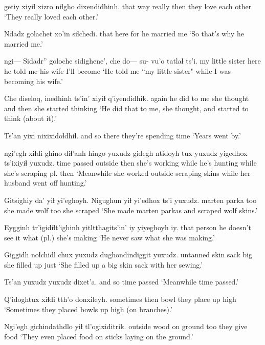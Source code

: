 \documentclass[12pt]{article}
\begin{document}
      getiy xiyiɬ xizro {niɬgho dixendidhinh.}
{that way} really then {} {they love each other}
\glt `They really loved each other.' 
\glend

\gll Ndadz  golachet xo'in siɬchedi.
that  here       for   {he married me}
\glt `So that's why he married me.'
\glend

\gll ngi--- Sidadr''           goloche   sidighene', {che do---} su- vu'o     tatlaɬ      ts'i.
{} {my little sister} here    {he told me} {} {}  {his wife} {I'll become }
\glt `He told me ``my little sister" while I was becoming his wife.'
\glend

\gll Che   diseloq,      inedhinh    ts'in' xiyiɬ q'iyendidhik.
again {he did to me} {she thought} and  then  {she started thinking}
\glt `He did that to me, she thought, and started to think (about it).'
\glend

\gll Ts'an  yixi      nixixidoɬdhiɬ.
{and so} there {they're spending time}
\glt `Years went by.'
\glend

 ngi'egh xiɬdi {ghino diɬ'anh}  hingo yuxudz {gidegh ntidoyh} tux   yuxudz yigedhox       ts'ixiyiɬ yuxudz.
{time passed} outside then  {she's working} while {} {he's hunting}     while {}   {she's scraping pl.}  then
\glt `Meanwhile she worked outside scraping skins while her husband went off hunting.'
\glend

\gll Gitsighiy da'   yiɬ yi'eghoyh. Nigughun yiɬ yi'edhox ts'i yuxudz.
marten    parka too {she made} wolf     too {she scraped}
\glt `She made marten parkas and scraped wolf skins.'
\glend

\gll Eygginh tr'igidiɬt'ighinh {yitltthagits'in'} iy {yiyeghoyh iy}.
{that person}   {}                {he doesn't see}   it {what (pl.) she's making}
\glt `He never saw what she was making.'
\glend

\gll Giggidh      noɬchidl chux yuxudz dughondindiggit   yuxudz.
{untanned skin} sack     big   {}    {she filled up} just
\glt `She filled up a big skin sack with her sewing.'
\glend

\gll Ts'an  yuxudz {yuxudz dixet'a.}
{and so} {} {time passed             }
\glt `Meanwhile time passed.'
\glend

\gll Q'idoghtux xiɬdi tth'o donxileyh.
sometimes  then  bowl   {they place up high}
\glt `Sometimes they placed bowls up high (on branches).'
\glend

\gll Ngi'egh gichindathdlo  yiɬ tl'ogixiditrik.
outside {wood on ground} too {they give food}
\glt `They even placed food on sticks laying on the ground.'
\glend
\end{document}
